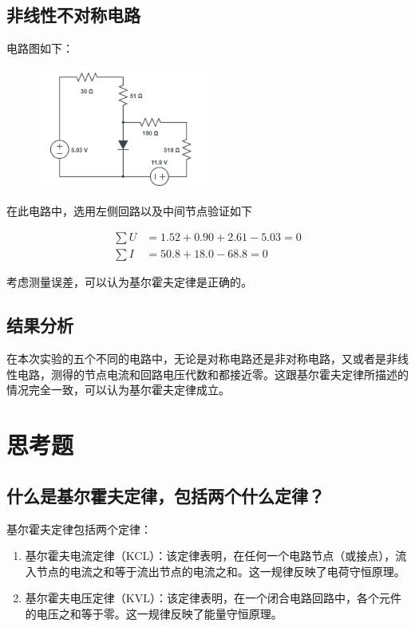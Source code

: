 \documentclass[a4paper,utf8]{article}
\begin{document}
    \subsection{非线性不对称电路}
        电路图如下： \par
        \begin{figure}[!ht]
            \includegraphics[width=0.5\textwidth]{cir5.png}
        \end{figure}\par
        在此电路中，选用左侧回路以及中间节点验证如下\par
        \begin{align*}
            \sum U&= 1.52+0.90+2.61-5.03=0\\
            \sum I&= 50.8+18.0-68.8=0
        \end{align*}\par
        考虑测量误差，可以认为基尔霍夫定律是正确的。

    \subsection{结果分析}
        在本次实验的五个不同的电路中，无论是对称电路还是非对称电路，又或者是非线性电路，测得的节点电流和回路电压代数和都接近零。这跟基尔霍夫定律所描述的情况完全一致，可以认为基尔霍夫定律成立。

\section{思考题}
    \subsection{什么是基尔霍夫定律，包括两个什么定律？}
        基尔霍夫定律包括两个定律：
        \begin{enumerate}
            \item 基尔霍夫电流定律（KCL）：该定律表明，在任何一个电路节点（或接点），流入节点的电流之和等于流出节点的电流之和。这一规律反映了电荷守恒原理。
            \item 基尔霍夫电压定律（KVL）：该定律表明，在一个闭合电路回路中，各个元件的电压之和等于零。这一规律反映了能量守恒原理。
        \end{enumerate}
\end{document}
